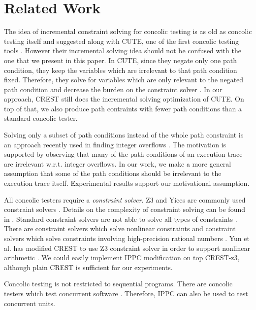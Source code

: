 \documentclass[EPiCempty]{easychair}
\begin{document}
\section{Related Work}
\label{sec:related}

The idea of incremental constraint solving for concolic testing is as old as concolic testing itself and suggested along with CUTE, one of the first concolic testing tools \cite{Sen:2005:CCU:1095430.1081750}. However their incremental solving idea should not be confused with the one that we present in this paper. In CUTE, since they negate only one path condition, they keep the variables which are irrelevant to that path condition fixed. Therefore, they solve for variables which are only relevant to the negated path condition and decrease the burden on the constraint solver \cite{Sen:2005:CCU:1095430.1081750}. In our approach, CREST still does the incremental solving optimization of CUTE. On top of that, we also produce path contraints with fewer path conditions than a standard concolic tester.

Solving only a subset of path conditions instead of the whole path constraint is an approach recently used in finding integer overflows \cite{DBLP:conf/asplos/Sidiroglou-Douskos15}. The motivation is supported by observing that many of the path conditions of an execution trace are irrelevant w.r.t. integer overflows. In our work, we make a more general assumption that some of the path conditions should be irrelevant to the execution trace itself. Experimental results support our motivational assumption.

All concolic testers require a \emph{constraint solver}. Z3 and Yices are commonly used constraint solvers \cite{Yices, DeMoura:2008:ZES:1792734.1792766}. Details on the complexity of constraint solving can be found in \cite{Tsang93foundationsof}. Standard constraint solvers are not able to solve all types of constraints \cite{Qu:2011:CSC:2082758.2083418}. There are constraint solvers which solve nonlinear constraints \cite{Nuzzo:2010:CSS:1998496.1998513} and constraint solvers which solve constraints involving high-precision rational numbers \cite{Souza:2011:CSC:1986308.1986337}. Yun et al. has modified CREST to use Z3 constraint solver in order to support nonlinear arithmetic \cite{website:crestz3}. We could easily implement IPPC modification on top CREST-z3, although plain CREST is sufficient for our experiments.

Concolic testing is not restricted to sequential programs. There are concolic testers which test concurrent software \cite{Farzan:2013:CT:2491411.2491453}. Therefore, IPPC can also be used to test concurrent units.
\end{document}
